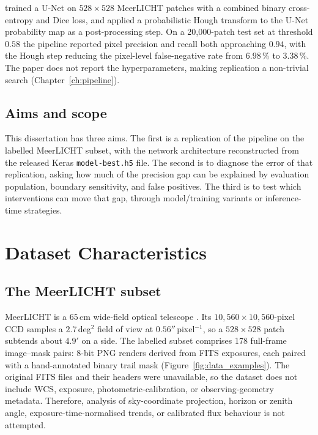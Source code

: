 \documentclass{cam-thesis}
\begin{document}
\citet{stoppa2024} trained a U-Net on $528\times528$ MeerLICHT patches with a
combined binary cross-entropy and Dice loss, and applied a probabilistic
Hough transform to the U-Net probability map as a post-processing step. On a
20{,}000-patch test set at threshold $0.58$ the pipeline reported
pixel precision and recall both approaching $0.94$, with the Hough step reducing
the pixel-level false-negative rate from $6.98\,\%$ to $3.38\,\%$. The paper does not report the
hyperparameters, making replication a non-trivial search (Chapter~\ref{ch:pipeline}).

\section{Aims and scope}
\label{sec:aims}

This dissertation has three aims. The first is a replication
of the \citet{stoppa2024} pipeline on the labelled MeerLICHT subset, with the
network architecture reconstructed from the released Keras \texttt{model-best.h5}
file. The second is to diagnose the error of that replication, asking how much of the
precision gap can be explained by evaluation population, boundary sensitivity,
and false positives. The third is to test which interventions can
move that gap, through model/training variants or inference-time strategies.

\chapter{Dataset Characteristics}
\label{ch:data}

\section{The MeerLICHT subset}
\label{sec:meerlicht}

MeerLICHT is a $65$\,cm wide-field optical telescope \citep{bloemen2016}.
Its $10{,}560\times10{,}560$-pixel CCD samples a
$2.7$\,deg$^2$ field of view at $0.56''$\,pixel$^{-1}$, so a $528\times528$ patch
subtends about $4.9'$ on a side. The labelled subset comprises 178 full-frame
image--mask pairs: 8-bit PNG renders derived from FITS exposures, each paired
with a hand-annotated binary trail mask (Figure~\ref{fig:data_examples}). The
original FITS files and their headers were unavailable, so the dataset does
not include {WCS}, exposure, photometric-calibration, or observing-geometry
metadata. Therefore, analysis of sky-coordinate projection, horizon or
zenith angle, exposure-time-normalised trends, or calibrated flux behaviour is not attempted.
\end{document}
